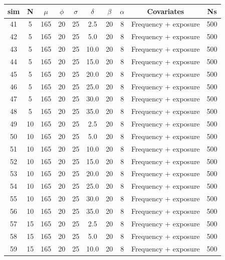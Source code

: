 \documentclass[
]{article}
\begin{document}
\begin{table}[H]
\centering
\begin{tabular}{cccccccccc}
\toprule
\textbf{sim} & \textbf{N} & \textbf{$\mu$} & \textbf{$\phi$} & \textbf{$\sigma$} & \textbf{$\delta$} & \textbf{$\beta$} & \textbf{$\alpha$} & \textbf{Covariates} & \textbf{Ns}\\
\midrule
\rowcolor{gray!6}  41 & 5 & 165 & 20 & 25 & 2.5 & 20 & 8 & Frequency + exposure & 500\\
42 & 5 & 165 & 20 & 25 & 5.0 & 20 & 8 & Frequency + exposure & 500\\
\rowcolor{gray!6}  43 & 5 & 165 & 20 & 25 & 10.0 & 20 & 8 & Frequency + exposure & 500\\
44 & 5 & 165 & 20 & 25 & 15.0 & 20 & 8 & Frequency + exposure & 500\\
\rowcolor{gray!6}  45 & 5 & 165 & 20 & 25 & 20.0 & 20 & 8 & Frequency + exposure & 500\\
46 & 5 & 165 & 20 & 25 & 25.0 & 20 & 8 & Frequency + exposure & 500\\
\rowcolor{gray!6}  47 & 5 & 165 & 20 & 25 & 30.0 & 20 & 8 & Frequency + exposure & 500\\
48 & 5 & 165 & 20 & 25 & 35.0 & 20 & 8 & Frequency + exposure & 500\\
\rowcolor{gray!6}  49 & 10 & 165 & 20 & 25 & 2.5 & 20 & 8 & Frequency + exposure & 500\\
50 & 10 & 165 & 20 & 25 & 5.0 & 20 & 8 & Frequency + exposure & 500\\
\rowcolor{gray!6}  51 & 10 & 165 & 20 & 25 & 10.0 & 20 & 8 & Frequency + exposure & 500\\
52 & 10 & 165 & 20 & 25 & 15.0 & 20 & 8 & Frequency + exposure & 500\\
\rowcolor{gray!6}  53 & 10 & 165 & 20 & 25 & 20.0 & 20 & 8 & Frequency + exposure & 500\\
54 & 10 & 165 & 20 & 25 & 25.0 & 20 & 8 & Frequency + exposure & 500\\
\rowcolor{gray!6}  55 & 10 & 165 & 20 & 25 & 30.0 & 20 & 8 & Frequency + exposure & 500\\
56 & 10 & 165 & 20 & 25 & 35.0 & 20 & 8 & Frequency + exposure & 500\\
\rowcolor{gray!6}  57 & 15 & 165 & 20 & 25 & 2.5 & 20 & 8 & Frequency + exposure & 500\\
58 & 15 & 165 & 20 & 25 & 5.0 & 20 & 8 & Frequency + exposure & 500\\
\rowcolor{gray!6}  59 & 15 & 165 & 20 & 25 & 10.0 & 20 & 8 & Frequency + exposure & 500\\

\end{tabular}
\end{table}
\end{document}
